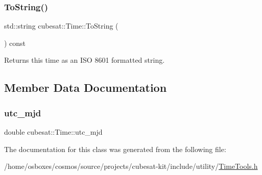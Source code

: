 \mbox{\label{classcubesat_1_1Time_acd77b6ff171d0961af6b78c2c7c6ffa4}} 
\subsubsection{\texorpdfstring{To\+String()}{ToString()}}
{\footnotesize\ttfamily std\+::string cubesat\+::\+Time\+::\+To\+String (\begin{DoxyParamCaption}{ }\end{DoxyParamCaption}) const\hspace{0.3cm}{\ttfamily [inline]}}



Returns this time as an I\+SO 8601 formatted string. 



\subsection{Member Data Documentation}
\mbox{\label{classcubesat_1_1Time_a8b8595226e81cc29bdb5d6b32d9a188c}} 
\subsubsection{\texorpdfstring{utc\+\_\+mjd}{utc\_mjd}}
{\footnotesize\ttfamily double cubesat\+::\+Time\+::utc\+\_\+mjd\hspace{0.3cm}{\ttfamily [private]}}



The documentation for this class was generated from the following file\+:\begin{DoxyCompactItemize}
\item 
/home/osboxes/cosmos/source/projects/cubesat-\/kit/include/utility/\hyperlink{TimeTools_8h}{Time\+Tools.\+h}\end{DoxyCompactItemize}
